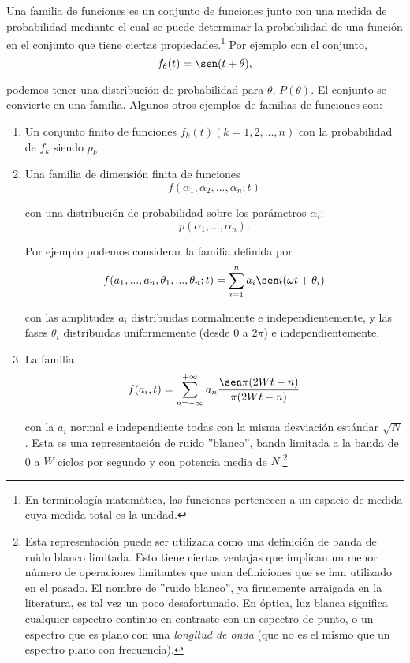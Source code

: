 Una familia de funciones es un conjunto de funciones junto con una medida de
probabilidad mediante el cual se puede determinar la probabilidad de una
funci\'on en el conjunto que tiene ciertas propiedades.\footnote[1]{En
terminolog\'ia matem\'atica, las funciones pertenecen a un espacio de medida
cuya medida total es la unidad.} Por ejemplo con el conjunto,
\begin{equation}
  f_{\theta}(t) = \sen(t+\theta),
\end{equation}

podemos tener una distribuci\'on de probabilidad para $\theta$, $P(\theta)$.
El conjunto se convierte en una familia. Algunos otros ejemplos de familias de
funciones son:

\begin{enumerate}
  \item Un conjunto finito de funciones $f_k(t)(k=1, 2, ..., n)$ con la
  probabilidad de $f_k$ siendo $p_k$.

  \item Una familia de dimensi\'on finita de funciones
  \begin{equation}
    f(\alpha_1, \alpha_2, ..., \alpha_n; t)
  \end{equation}

  con una distribuci\'on de probabilidad sobre los par\'ametros $\alpha_i$:
  \begin{equation}
    p(\alpha_1, ..., \alpha_n).
  \end{equation}

  Por ejemplo podemos considerar la familia definida por
  \begin{equation}
    f(a_1, ..., a_n, \theta_1, ..., \theta_n; t) = \sum_{i=1}^{n} a_i \sen
    i (\omega t + \theta_i)
  \end{equation}

  con las amplitudes $a_i$ distribuidas normalmente e independientemente, y
  las fases $\theta_i$ distribuidas uniformemente (desde 0 a $2\pi$) e
  independientemente.


  \item La familia
  \begin{equation}
    f(a_i, t) = \sum_{n=-\infty}^{+\infty} a_n \frac{\sen\pi(2Wt-n)}{\pi(2Wt-n)}
  \end{equation}

  con la $a_i$ normal e independiente todas con la misma desviaci\'on
  est\'andar $\sqrt{N}$. Esta es una representaci\'on de ruido ''blanco'',
  banda limitada a la banda de 0 a $W$ ciclos por segundo y con potencia media
  de $N$.\footnote[2]{Esta representaci\'on puede ser utilizada como una
  definici\'on de banda de ruido blanco limitada. Esto tiene ciertas ventajas
  que implican un menor n\'umero de operaciones limitantes que usan definiciones
  que se han utilizado en el pasado. El nombre de ''ruido blanco'', ya
  firmemente arraigada en la literatura, es tal vez un poco desafortunado. En
  \'optica, luz blanca significa cualquier espectro continuo en contraste con
  un espectro de punto, o un espectro que es plano con una {\em longitud de
  onda} (que no es el mismo que un espectro plano con frecuencia).}


\end{enumerate}
